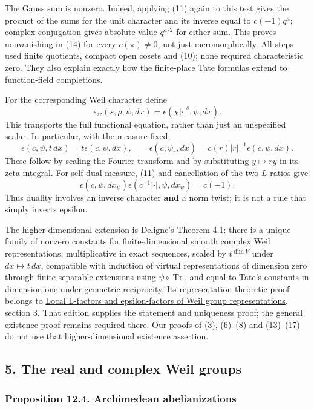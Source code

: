 \documentclass[11pt,a4paper]{article}
\begin{document}
The Gauss sum is nonzero. Indeed, applying (11) again to this test gives
the product of the sums for the unit character and its inverse equal to
\(c(-1)q^a\); complex conjugation gives absolute value \(q^{a/2}\) for
either sum. This proves nonvanishing in (14) for every \(c(\pi)\ne0\),
not just meromorphically. All steps used finite quotients, compact open
cosets and (10); none required characteristic zero. They also explain
exactly how the finite-place Tate formulas extend to function-field
completions.

For the corresponding Weil character define \[
\epsilon_{\mathrm{ar}}(s,\rho,\psi,dx)
=\epsilon(\chi|\cdot|^s,\psi,dx).
\tag{15}
\] This transports the full functional equation, rather than just an
unspecified scalar. In particular, with the measure fixed, \[
\epsilon(c,\psi,t\,dx)=t\epsilon(c,\psi,dx),\qquad
\epsilon(c,\psi_r,dx)=c(r)|r|^{-1}\epsilon(c,\psi,dx).
\tag{16}
\] These follow by scaling the Fourier transform and by substituting
\(y\mapsto ry\) in its zeta integral. For self-dual measure, (11) and
cancellation of the two \(L\)-ratios give \[
\epsilon(c,\psi,dx_\psi)\epsilon(c^{-1}|\cdot|,\psi,dx_\psi)=c(-1).
\tag{17}
\] Thus duality involves an inverse character \textbf{and} a norm twist;
it is not a rule that simply inverts epsilon.

The higher-dimensional extension is Deligne's Theorem 4.1: there is a
unique family of nonzero constants for finite-dimensional smooth complex
Weil representations, multiplicative in exact sequences, scaled by
\(t^{\dim V}\) under \(dx\mapsto t\,dx\), compatible with induction of
virtual representations of dimension zero through finite separable
extensions using \(\psi\circ\operatorname{Tr}\), and equal to Tate's
constants in dimension one under geometric reciprocity. Its
representation-theoretic proof belongs to
\href{https://kokunoyumeto.github.io/open-math-courses/courses/NT-CFT/proof-dependencies.html\#LG-GAL-06}{Local
L-factors and epsilon-factors of Weil group representations}, section 3.
That edition supplies the statement and uniqueness proof; the general
existence proof remains required there. Our proofs of (3), (6)--(8) and
(13)--(17) do not use that higher-dimensional existence assertion.

\subsection{5. The real and complex Weil
groups}\label{the-real-and-complex-weil-groups}

\subsubsection{Proposition 12.4. Archimedean
abelianizations}\label{proposition-12.4.-archimedean-abelianizations}
\end{document}
